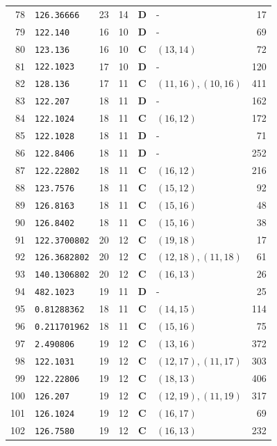 \documentclass[11pt,a4paper]{article}
\begin{document}
\begin{small}
\begin{longtable}{r l c c c l r}
78 & \texttt{126.36666} & 23 & 14 & \textbf{D} & - & 17 \\
79 & \texttt{122.140} & 16 & 10 & \textbf{D} & - & 69 \\
80 & \texttt{123.136} & 16 & 10 & \textbf{C} & $(13,14)$ & 72 \\
81 & \texttt{122.1023} & 17 & 10 & \textbf{D} & - & 120 \\
82 & \texttt{128.136} & 17 & 11 & \textbf{C} & $(11,16), (10,16)$ & 411 \\
83 & \texttt{122.207} & 18 & 11 & \textbf{D} & - & 162 \\
84 & \texttt{122.1024} & 18 & 11 & \textbf{C} & $(16,12)$ & 172 \\
85 & \texttt{122.1028} & 18 & 11 & \textbf{D} & - & 71 \\
86 & \texttt{122.8406} & 18 & 11 & \textbf{D} & - & 252 \\
87 & \texttt{122.22802} & 18 & 11 & \textbf{C} & $(16,12)$ & 216 \\
88 & \texttt{123.7576} & 18 & 11 & \textbf{C} & $(15,12)$ & 92 \\
89 & \texttt{126.8163} & 18 & 11 & \textbf{C} & $(15,16)$ & 48 \\
90 & \texttt{126.8402} & 18 & 11 & \textbf{C} & $(15,16)$ & 38 \\
91 & \texttt{122.3700802} & 20 & 12 & \textbf{C} & $(19,18)$ & 17 \\
92 & \texttt{126.3682802} & 20 & 12 & \textbf{C} & $(12,18), (11,18)$ & 61 \\
93 & \texttt{140.1306802} & 20 & 12 & \textbf{C} & $(16,13)$ & 26 \\
94 & \texttt{482.1023} & 19 & 11 & \textbf{D} & - & 25 \\
95 & \texttt{0.81288362} & 18 & 11 & \textbf{C} & $(14,15)$ & 114 \\
96 & \texttt{0.211701962} & 18 & 11 & \textbf{C} & $(15,16)$ & 75 \\
97 & \texttt{2.490806} & 19 & 12 & \textbf{C} & $(13,16)$ & 372 \\
98 & \texttt{122.1031} & 19 & 12 & \textbf{C} & $(12,17), (11,17)$ & 303 \\
99 & \texttt{122.22806} & 19 & 12 & \textbf{C} & $(18,13)$ & 406 \\
100 & \texttt{126.207} & 19 & 12 & \textbf{C} & $(12,19), (11,19)$ & 317 \\
101 & \texttt{126.1024} & 19 & 12 & \textbf{C} & $(16,17)$ & 69 \\
102 & \texttt{126.7580} & 19 & 12 & \textbf{C} & $(16,13)$ & 232 \\

\end{longtable}
\end{small}
\end{document}

